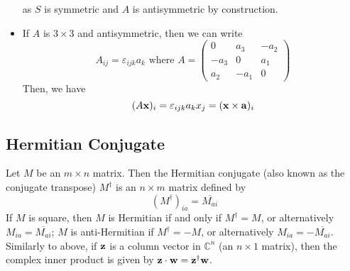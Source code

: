\begin{itemize}
	      as \(S\) is symmetric and \(A\) is antisymmetric by construction.
	\item If \(A\) is \(3 \times 3\) and antisymmetric, then we can write
	      \[ A_{ij} = \varepsilon_{ijk}a_k\text{ where } A = \begin{pmatrix}
			      0    & a_3  & -a_2 \\
			      -a_3 & 0    & a_1  \\
			      a_2  & -a_1 & 0
		      \end{pmatrix} \]
	      Then, we have
	      \[
		      (A \vb x)_i = \varepsilon_{ijk}a_k x_j = (\vb x \times \vb a)_i
	      \]
\end{itemize}

\subsection{Hermitian Conjugate}
Let \(M\) be an \(m \times n\) matrix. Then the Hermitian conjugate (also known as the conjugate transpose) \(M^\dagger\) is an \(n \times m\) matrix defined by
\[
	(M^\dagger)_{ia} = \overline{M_{ai}}
\]
If \(M\) is square, then \(M\) is Hermitian if and only if \(M^\dagger = M\), or alternatively \(M_{ia} = \overline{M_{ai}}\); \(M\) is anti-Hermitian if \(M^\dagger = -M\), or alternatively \(M_{ia} = -\overline{M_{ai}}\). Similarly to above, if \(\vb z\) is a column vector in \(\mathbb C^n\) (an \(n \times 1\) matrix), then the complex inner product is given by \(\vb z \cdot \vb w = \vb z^\dagger \vb w\).

